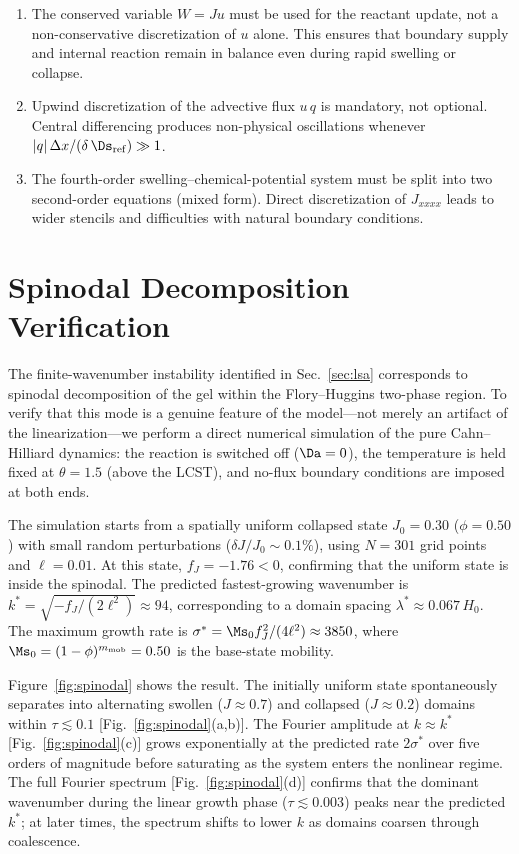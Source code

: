 \begin{enumerate}
  \item The conserved variable $W = Ju$ must be used for the reactant update, not a non-conservative discretization of $u$ alone. This ensures that boundary supply and internal reaction remain in balance even during rapid swelling or collapse.
  \item Upwind discretization of the advective flux $u\,q$ is mandatory, not optional. Central differencing produces non-physical oscillations whenever $|q|\,\Delta x / (\delta\,\Ds_\mathrm{ref}) \gg 1$.
  \item The fourth-order swelling--chemical-potential system must be split into two second-order equations (mixed form). Direct discretization of $J_{xxxx}$ leads to wider stencils and difficulties with natural boundary conditions.
\end{enumerate}


\section{Spinodal Decomposition Verification}
\label{app:spinodal}

The finite-wavenumber instability identified in
Sec.~\ref{sec:lsa} corresponds to spinodal decomposition of the gel
within the Flory--Huggins two-phase region.  To verify that this mode
is a genuine feature of the model---not merely an artifact of the
linearization---we perform a direct numerical simulation of the
pure Cahn--Hilliard dynamics: the reaction is switched off ($\Da=0$),
the temperature is held fixed at $\theta=1.5$ (above the LCST), and
no-flux boundary conditions are imposed at both ends.

The simulation starts from a spatially uniform collapsed state
$J_0=0.30$ ($\phi=0.50$) with small random perturbations
($\delta J/J_0\sim 0.1\%$), using $N=301$ grid points and
$\ell=0.01$.  At this state, $f_J=-1.76<0$, confirming that the
uniform state is inside the spinodal.  The predicted
fastest-growing wavenumber is
$k^\ast=\sqrt{-f_J/(2\ell^2)}\approx 94$, corresponding to a
domain spacing $\lambda^\ast\approx 0.067\,H_0$.  The maximum
growth rate is $\sigma^\ast=\Ms_0 f_J^2/(4\ell^2)\approx 3850$,
where $\Ms_0=(1-\phi)^{m_\mathrm{mob}}=0.50$ is the base-state
mobility.

Figure~\ref{fig:spinodal} shows the result.  The initially uniform
state spontaneously separates into alternating swollen
($J\approx 0.7$) and collapsed ($J\approx 0.2$) domains within
$\tau\lesssim 0.1$ [Fig.~\ref{fig:spinodal}(a,b)].  The Fourier
amplitude at $k\approx k^\ast$ [Fig.~\ref{fig:spinodal}(c)] grows
exponentially at the predicted rate $2\sigma^\ast$ over five orders
of magnitude before saturating as the system enters the nonlinear
regime.  The full Fourier spectrum
[Fig.~\ref{fig:spinodal}(d)] confirms that the dominant
wavenumber during the linear growth phase ($\tau\lesssim 0.003$)
peaks near the predicted $k^\ast$; at later times, the spectrum
shifts to lower $k$ as domains coarsen through coalescence.

